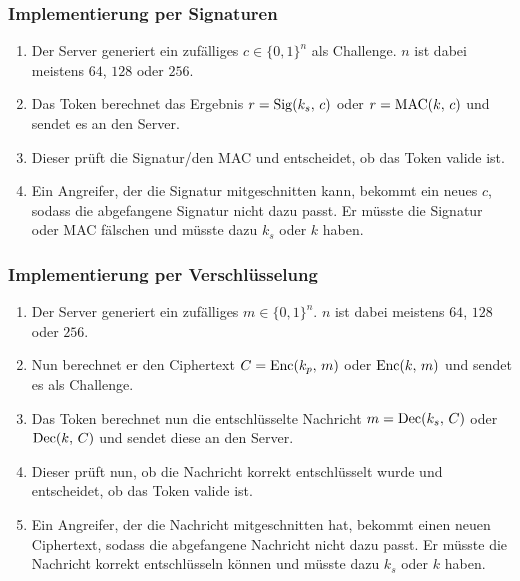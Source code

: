 			\subsubsection{Implementierung per Signaturen}
				\begin{enumerate}
					\item Der Server generiert ein zufälliges \( c \in \{0,1\}^n \) als Challenge. \(n\) ist dabei meistens \(64\), \(128\) oder \(256\).
					\item Das Token berechnet das Ergebnis \( r = \operatorname{Sig}(k_s,\, c) \) oder \( r = \operatorname{MAC}(k,\, c) \) und sendet es an den Server.
					\item Dieser prüft die Signatur/den MAC und entscheidet, ob das Token valide ist.
					\item Ein Angreifer, der die Signatur mitgeschnitten kann, bekommt ein neues \(c\), sodass die abgefangene Signatur nicht dazu passt. Er müsste die Signatur oder MAC fälschen und müsste dazu \(k_s\) oder \(k\) haben.
				\end{enumerate}

			\subsubsection{Implementierung per Verschlüsselung}
				\begin{enumerate}
					\item Der Server generiert ein zufälliges \(m \in \{0,1\}^n\). \(n\) ist dabei meistens \(64\), \(128\) oder \(256\).
					\item Nun berechnet er den Ciphertext \( C = \operatorname{Enc}(k_p,\, m) \) oder \( \operatorname{Enc}(k,\, m) \) und sendet es als Challenge.
					\item Das Token berechnet nun die entschlüsselte Nachricht \( m = \operatorname{Dec}(k_s,\, C) \) oder \( \operatorname{Dec}(k,\, C) \) und sendet diese an den Server.
					\item Dieser prüft nun, ob die Nachricht korrekt entschlüsselt wurde und entscheidet, ob das Token valide ist.
					\item Ein Angreifer, der die Nachricht mitgeschnitten hat, bekommt einen neuen Ciphertext, sodass die abgefangene Nachricht nicht dazu passt. Er müsste die Nachricht korrekt entschlüsseln können und müsste dazu \(k_s\) oder \(k\) haben.
				\end{enumerate}

